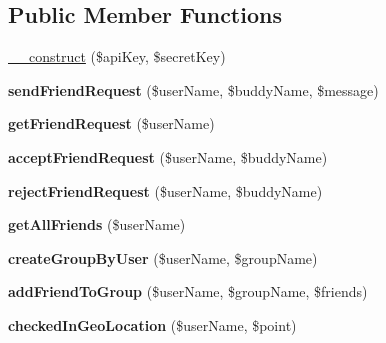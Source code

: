 \subsection*{Public Member Functions}
\begin{DoxyCompactItemize}
\item 
\hyperlink{class_buddy_service_a49f2ad222e06420736d750e167d55d7c}{\+\_\+\+\_\+construct} (\$api\+Key, \$secret\+Key)
\item 
\hypertarget{class_buddy_service_a06d89d182029cdbce962112660971179}{{\bfseries send\+Friend\+Request} (\$user\+Name, \$buddy\+Name, \$message)}\label{class_buddy_service_a06d89d182029cdbce962112660971179}

\item 
\hypertarget{class_buddy_service_ae93a13f2a028933da204e5e97d63571e}{{\bfseries get\+Friend\+Request} (\$user\+Name)}\label{class_buddy_service_ae93a13f2a028933da204e5e97d63571e}

\item 
\hypertarget{class_buddy_service_a82b4e57ee2b0309a0fde368a77977a94}{{\bfseries accept\+Friend\+Request} (\$user\+Name, \$buddy\+Name)}\label{class_buddy_service_a82b4e57ee2b0309a0fde368a77977a94}

\item 
\hypertarget{class_buddy_service_a471a791640ec42e54a6f7ce68c07cd88}{{\bfseries reject\+Friend\+Request} (\$user\+Name, \$buddy\+Name)}\label{class_buddy_service_a471a791640ec42e54a6f7ce68c07cd88}

\item 
\hypertarget{class_buddy_service_a5b5e775f4d2aeb866270e7d061948c8a}{{\bfseries get\+All\+Friends} (\$user\+Name)}\label{class_buddy_service_a5b5e775f4d2aeb866270e7d061948c8a}

\item 
\hypertarget{class_buddy_service_a9014a0ab25d1f344d6800769219b9340}{{\bfseries create\+Group\+By\+User} (\$user\+Name, \$group\+Name)}\label{class_buddy_service_a9014a0ab25d1f344d6800769219b9340}

\item 
\hypertarget{class_buddy_service_ad2b13beb0d59af38b8a27487851dfefe}{{\bfseries add\+Friend\+To\+Group} (\$user\+Name, \$group\+Name, \$friends)}\label{class_buddy_service_ad2b13beb0d59af38b8a27487851dfefe}

\item 
\hypertarget{class_buddy_service_a36624d45fc1c5819dc87656f45861a95}{{\bfseries checked\+In\+Geo\+Location} (\$user\+Name, \$point)}\label{class_buddy_service_a36624d45fc1c5819dc87656f45861a95}


\end{DoxyCompactItemize}
